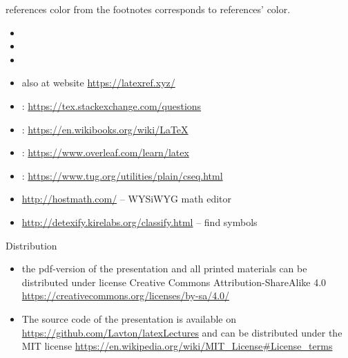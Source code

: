 \documentclass[aspectratio=169]{beamer}
\begin{document}
\begin{frame}[allowframebreaks]{references}
color from the footnotes corresponds to references' color.
    \begin{itemize}
        \item {}
        \item {}
        \item {}
        \item {} also at website \url{https://latexref.xyz/}
        \item {} : \url{https://tex.stackexchange.com/questions}
        \item {} : \url{https://en.wikibooks.org/wiki/LaTeX}
        \item {} : \url{https://www.overleaf.com/learn/latex}
        \item {} : \url{https://www.tug.org/utilities/plain/cseq.html}
        \item \url{http://hostmath.com/} -- WYSiWYG math editor
        \item \url{http://detexify.kirelabs.org/classify.html} -- find symbols
    \end{itemize}
\end{frame}

\begin{frame}{Distribution}\relax
\begin{itemize}
     \item the pdf-version of the presentation and all printed materials can be distributed under license Creative Commons Attribution-ShareAlike 4.0 \url{https://creativecommons.org/licenses/by-sa/4.0/}
     \item The source code of the presentation is available on {\csk\url{https://github.com/Lavton/latexLectures}} and can be distributed under the MIT license \url{https://en.wikipedia.org/wiki/MIT_License\#License_terms}
\end{itemize}
     
\end{frame}
\end{document}
